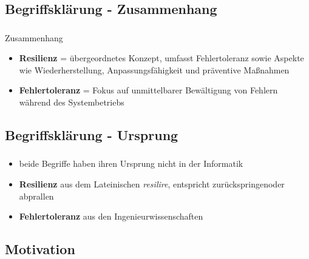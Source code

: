 \subsection{Begriffsklärung - Zusammenhang}

\begin{frame}
    \frametitle{\insertsection}
    \framesubtitle{\insertsubsection}

    \begin{block}{Zusammenhang}
        \begin{itemize}
            \item \textbf{Resilienz} = übergeordnetes Konzept, umfasst Fehlertoleranz sowie Aspekte wie Wiederherstellung, Anpassungsfähigkeit und präventive Maßnahmen\\
            \item \textbf{Fehlertoleranz} = Fokus auf unmittelbarer Bewältigung von Fehlern während des Systembetriebs
        \end{itemize}
    \end{block}
\end{frame}

\subsection{Begriffsklärung - Ursprung}

\begin{frame}
    \frametitle{\insertsection}
    \framesubtitle{\insertsubsection}

        \begin{itemize}
            \item beide Begriffe haben ihren Ursprung nicht in der Informatik
            \item \textbf{Resilienz} aus dem Lateinischen \textit{resilire}, entspricht \glqq zurückspringen\grqq oder  \glqq abprallen\grqq
            \item \textbf{Fehlertoleranz} aus den Ingenieurwissenschaften
        \end{itemize}
\end{frame}

\subsection{Motivation}

